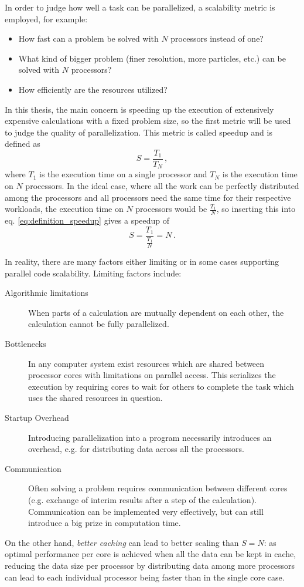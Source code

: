 \documentclass[main.tex]{subfiles}
\begin{document}

In order to judge how well a task can be parallelized, a scalability metric is employed, for example:
\begin{itemize}
    \item How fast can a problem be solved with \(N\) processors instead of one?
    \item What kind of bigger problem (finer resolution, more particles, etc.) can be solved with \(N\) processors?
    \item How efficiently are the resources utilized?
\end{itemize}
In this thesis, the main concern is speeding up the execution of extensively expensive calculations with a fixed problem size, so the first metric will be used to judge the quality of parallelization.
This metric is called speedup and is defined as 
\begin{equation}\label{eq:definition_speedup}
    S = \frac{T_1}{T_N}\,, 
\end{equation}
where \(T_1\) is the execution time on a single processor and \(T_N\) is the execution time on \(N\) processors.
In the ideal case, where all the work can be perfectly distributed among the processors and all processors need the same time for their respective workloads, the execution time on \(N\) processors would be \(\frac{T_1}{N}\), so inserting this into eq. \ref{eq:definition_speedup} gives a speedup of
\begin{equation}\label{eq:ideal_speedup}
    S = \frac{T_1}{\frac{T_1}{N}} = N\,.
\end{equation}

In reality, there are many factors either limiting or in some cases supporting parallel code scalability. Limiting factors include:
\begin{description}
    \item[Algorithmic limitations] When parts of a calculation are mutually dependent on each other, the calculation cannot be fully parallelized.
    \item[Bottlenecks] In any computer system exist resources which are shared between processor cores with limitations on parallel access. This serializes the execution by requiring cores to wait for others to complete the task which uses the shared resources in question.
    \item[Startup Overhead] Introducing parallelization into a program necessarily introduces an overhead, e.g. for distributing data across all the processors.
    \item[Communication] Often solving a problem requires communication between different cores (e.g. exchange of interim results after a step of the calculation). Communication can be implemented very effectively, but can still introduce a big prize in computation time.
\end{description}
On the other hand, \emph{better caching} can lead to better scaling than \(S = N\): as optimal performance per core is achieved when all the data can be kept in cache, reducing the data size per processor by distributing data among more processors can lead to each individual processor being faster than in the single core case.
\end{document}
